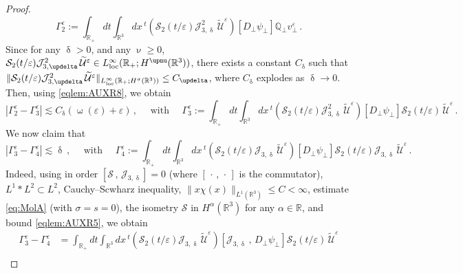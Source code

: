 \documentclass[11pt,reqno]{amsart}
\def \R{{\mathbb{R}}}
\def \Q{{\mathbb{Q}}}
\begin{document}
\begin{proof}
\begin{equation}
    \Gamma_2^\varepsilon:=  \int_{\R_+} dt \int_{\R^3}dx\, {}^t(\mathcal S_2(t/\varepsilon) \mathcal J_{3,\updelta}^2 \,\widetilde{\mathcal U}^\varepsilon)[ D_\perp \psi_\perp]  \Q_\perp v_\perp^\varepsilon\,.
  \end{equation}
  Since for any $\updelta >0$, and any $\upnu \geq 0$, $\mathcal S_2(t/\varepsilon) \mathcal J_{3,\updelta}^2 \,\widetilde{\mathcal U}^\varepsilon \in L_{\rm loc}^\infty(\R_+;H^{\upnu}(\R^3))$, there exists a constant   $C_\updelta$  such that $\| \mathcal S_2(t/\varepsilon) \mathcal J_{3,\updelta}^2 \,\widetilde{\mathcal U}^\varepsilon\|_{ L_{\rm loc}^\infty(\R_+;H^{\sigma}(\R^3))} \leq C_\updelta$, where $C_\updelta$ explodes as $\updelta \rightarrow 0$. Then, using \eqref{eqlem:AUXR8}, we obtain
  \begin{equation}
    \label{eqn:RTT-R:7}
    |\Gamma_2^\varepsilon- \Gamma_3^\varepsilon| \lesssim C_\updelta (\upomega(\varepsilon)+\varepsilon)\,, \quad \mbox{ with } \quad
    \Gamma_3^\varepsilon:=  \int_{\R_+} dt \int_{\R^3}dx\, {}^t(\mathcal S_2(t/\varepsilon) \mathcal J_{3,\updelta}^2 \,\widetilde{\mathcal U}^\varepsilon)[ D_\perp \psi_\perp] \mathcal S_2(t/\varepsilon) \,\widetilde{\mathcal U}^\varepsilon \,.
    \end{equation}
  We now claim that
  \begin{equation}
    \label{eqn:RTT-R:8}
    |\Gamma_3^\varepsilon- \Gamma_4^\varepsilon| \lesssim \updelta\,, \quad \mbox{ with } \quad
    \Gamma_4^\varepsilon:=  \int_{\R_+} dt \int_{\R^3}dx\, {}^t(\mathcal S_2(t/\varepsilon) \mathcal J_{3,\updelta} \,\widetilde{\mathcal U}^\varepsilon)[D_\perp \psi_\perp] \mathcal S_2(t/\varepsilon) \mathcal J_{3,\updelta} \,\widetilde{\mathcal U}^\varepsilon \,.
    \end{equation}
  Indeed, using in order $[\mathcal S\, ,\, \mathcal J_{3,\updelta}]=0$ (where $[\,\cdot\, ,\, \cdot\,]$ is the commutator), $L^1\ast L^2 \subset L^2$, Cauchy--Scwharz inequality, $\| x \chi(x)\|_{L^1(\R^3)}\leq C <\infty$,  estimate \eqref{eq:MolA} (with $\sigma=s=0$), the isometry $\mathcal S $ in $H^\alpha(\R^3)$ for any $ \alpha\in \R$, and bound \eqref{eqlem:AUXR5}, we obtain
  \begin{align*}
    \Gamma_3^\varepsilon- \Gamma_4^\varepsilon &=
    \int_{\R_+} dt \int_{\R^3}dx\, {}^t(\mathcal S_2(t/\varepsilon) \mathcal J_{3,\updelta} \,\widetilde{\mathcal U}^\varepsilon) 
        [\mathcal J_{3,\updelta} \,,\, D_\perp \psi_\perp] \mathcal S_2(t/\varepsilon)\,\widetilde{\mathcal U}^\varepsilon \\

\end{align*}
\end{proof}
\end{document}
